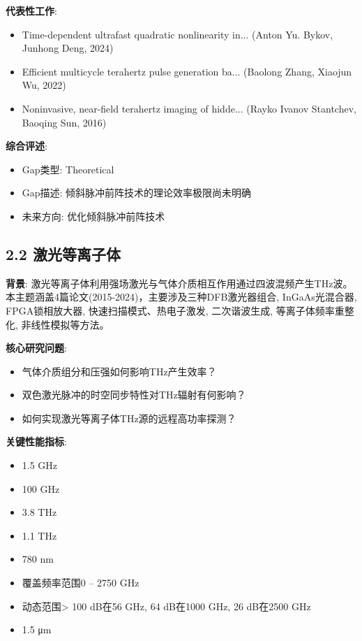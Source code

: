 \documentclass[12pt]{article}
\begin{document}
\textbf{代表性工作}:
\begin{itemize}
\item [1] Time-dependent ultrafast quadratic nonlinearity in... (Anton Yu. Bykov, Junhong Deng, 2024)
\item [2] Efficient multicycle terahertz pulse generation ba... (Baolong Zhang, Xiaojun Wu, 2022)
\item [3] Noninvasive, near-field terahertz imaging of hidde... (Rayko Ivanov Stantchev, Baoqing Sun, 2016)
\end{itemize}

\textbf{综合评述}:
\begin{itemize}
\item Gap类型: Theoretical
\item Gap描述: 倾斜脉冲前阵技术的理论效率极限尚未明确
\item 未来方向: 优化倾斜脉冲前阵技术
\end{itemize}


\subsection{2.2 激光等离子体}

\textbf{背景}: 激光等离子体利用强场激光与气体介质相互作用通过四波混频产生THz波。本主题涵盖4篇论文(2015-2024)，主要涉及三种DFB激光器组合, InGaAs光混合器, FPGA锁相放大器, 快速扫描模式、热电子激发, 二次谐波生成, 等离子体频率重整化, 非线性模拟等方法。

\textbf{核心研究问题}:
\begin{itemize}
\item 气体介质组分和压强如何影响THz产生效率？
\item 双色激光脉冲的时空同步特性对THz辐射有何影响？
\item 如何实现激光等离子体THz源的远程高功率探测？
\end{itemize}

\textbf{关键性能指标}:
\begin{itemize}
\item 1.5 GHz
\item 100 GHz
\item 3.8 THz
\item 1.1 THz
\item 780 nm
\item 覆盖频率范围0 – 2750 GHz
\item 动态范围> 100 dB在56 GHz, 64 dB在1000 GHz, 26 dB在2500 GHz
\item 1.5 μm
\end{itemize}
\end{document}
